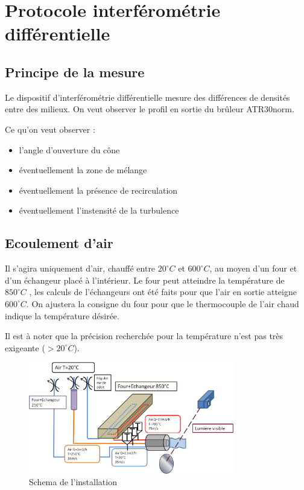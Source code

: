 \chapter[Protocole interférométrie différentielle ]%
{Protocole interférométrie différentielle}


\section{Principe de la mesure}

Le dispositif d'interférométrie différentielle mesure des différences de densités entre des milieux. On veut observer le profil en sortie du brûleur ATR30norm.

Ce qu'on veut observer :
\begin{itemize}
\item l'angle d'ouverture du cône
\item éventuellement la zone de mélange
\item éventuellement la présence de recirculation
\item éventuellement l'instensité de la turbulence
\end{itemize}

\section{Ecoulement d'air}
Il s'agira uniquement d'air, chauffé entre $20^\circ C$ et $600^\circ C$, au moyen d'un four et d'un échangeur placé à l'intérieur. Le four peut atteindre la température de $850^\circ C$ , les calculs de l'échangeurs ont été faits pour que l'air en sortie atteigne $600 ^\circ C$. On ajustera la consigne du four pour que le thermocouple de l'air chaud indique la température désirée.

Il est à noter que la précision recherchée pour la température n'est pas très exigeante ($ > 20^\circ C$).
\begin{figure}[!h]
  \centering
\includegraphics[width=0.8\textwidth]{fig/EPR_schema_installation.png}
  \caption{Schema de l'installation}
 \label{schema_installation}
\end{figure}

